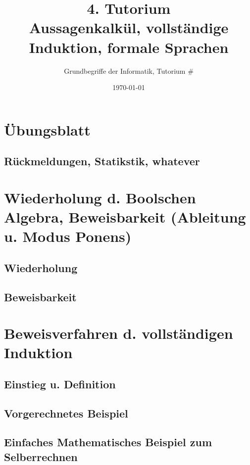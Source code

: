 



\title[Aussagenkalkül, vollständige Induktion, formale Sprachen]{4. Tutorium\\ Aussagenkalkül, vollständige Induktion, formale Sprachen}
\subtitle{Grundbegriffe der Informatik, Tutorium \#\mytutnumber}
\date{\today}


\titleframe
\roadmap

\section*{Übungsblatt}
\subsection{Rückmeldungen, Statikstik, whatever}

\section[Boolsche Algebra]{Wiederholung d. Boolschen Algebra, Beweisbarkeit (Ableitung u. Modus Ponens)}
\subsection{Wiederholung}
\subsection{Beweisbarkeit}

\section{Beweisverfahren d. vollständigen Induktion}
\subsection{Einstieg u. Definition}
\subsection{Vorgerechnetes Beispiel}
\subsection{Einfaches Mathematisches Beispiel zum Selberrechnen}

